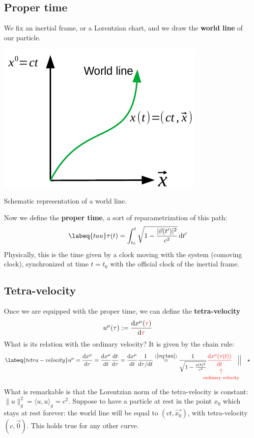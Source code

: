 \documentclass[../main.tex]{subfiles}
\begin{document}
\subsection{Proper time}
We fix an inertial frame, or a Lorentzian chart, and we draw the \textbf{world line} of our particle.
\begin{marginfigure}
    \centering
	\includegraphics[width=1\linewidth]{images/World_line.pdf}
	\caption{Schematic representation of a world line.}
\end{marginfigure}
Now we define the \textbf{proper time}, a sort of reparametrization of this path:  
\begin{equation}\labeq{tau}
\tau(t)=\int_{t_0}^t \sqrt{1-\frac{|\Vec{v}(t')|^2}{c^2}}\dd{t'}
\end{equation}
Physically, this is the time given by a clock moving with the system (comoving clock), synchronized at time $t=t_0$ with the official clock of the inertial frame.
\subsection{Tetra-velocity}
Once we are equipped with the proper time, we can define the \textbf{tetra-velocity}
\[
u^{\mu}(\tau):=\dv{x^{\mu}({\color{red}\tau})}{\color{red}\tau}
\]
What is its relation with the ordinary velocity? It is given by the chain rule:\marginnote{
\[
\norm{u}^2_g=\frac{c^2-v^2}{1-\frac{v^2}{c^2}^2}=\frac{1}{\frac{1}{c^2}}\frac{\cancel{c^2-v^2}}{\cancel{c^2-v^2}}=c^2
\]}
\begin{equation}\labeq{tetra-velocity}
u^{\mu}=\dv{x^{\mu}}{\tau}=\dv{x^{\mu}}{t}\dv{t}{\tau}=\dv{x^{\mu}}{t}\frac{1}{\textrm{d}\tau/\textrm{d} t}\overset{(\ref{eq:tau})}{=}\frac{1}{\sqrt{1-\frac{v(t)^2}{c^2}}}{\color{red}\dv{x^{\mu}(\tau(t))}{\underset{\mathclap{\tikz \node {$\uparrow$} node [below=1ex] {\footnotesize ordinary velocity };}}t}}\quad \Big|\Big| \quad \star
\end{equation}
What is remarkable is that the Lorentzian norm of the tetra-velocity is constant: $\rVert u \rVert^2_g=\langle u,u \rangle_g=c^2$. Suppose to have a particle at rest in the point $x_0$ which stays at rest forever: the world line will be equal to $(ct,\Vec{x_0})$, with tetra-velocity $(c,\Vec{0})$. This holds true for any other curve.
\end{document}
